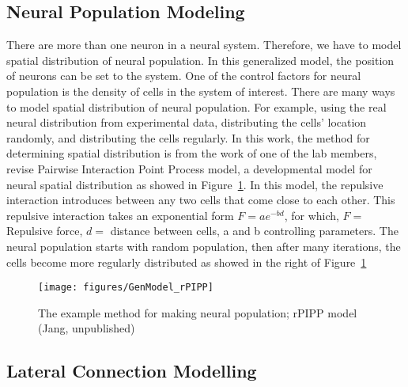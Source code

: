 \subsection{Neural Population Modeling}
There are more than one neuron in a neural system. Therefore, we have to model spatial distribution of neural population. In this generalized model, the position of neurons can be set to the system. One of the control factors for neural population is the density of cells in the system of interest. There are many ways to model spatial distribution of neural population. For example, using the real neural distribution from experimental data, distributing the cells' location randomly, and distributing the cells regularly. In this work, the method for determining spatial distribution is from the work of one of the lab members, revise Pairwise Interaction Point Process model, a developmental model for neural spatial distribution as showed in Figure~\ref{fig:rPIPP}.
In this model, the repulsive interaction introduces between any two cells that come close to each other. This repulsive interaction takes an exponential form $F = a e^{-bd}$, for which, $F =$ Repulsive force, $d = $ distance between cells, a and b controlling parameters. The neural population starts with random population, then after many iterations,  the cells become more regularly distributed as showed in the right of Figure~\ref{fig:rPIPP}

\begin{figure}[!h]
	\centering
	\texttt{[image: figures/GenModel\_rPIPP]}
	\caption{The example method for making neural population; rPIPP model (Jang, unpublished)}
	\label{fig:rPIPP}
\end{figure} 

\subsection{Lateral Connection Modelling}

